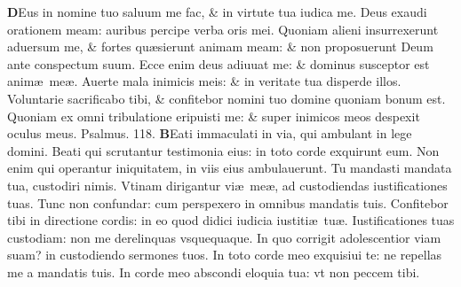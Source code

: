 \documentclass[a5paper,10pt]{book}
\def\ae{æ}
\begin{document}
\begin{multicols*}{2}
\lettrine[lines=2]{\bfseries D}{}Eus in nomine tuo saluum me fac, \& in virtute tua iudica me.
\newline \color{red} D\color{black}eus exaudi orationem meam: auribus percipe verba oris mei.
\newline \color{red} Q\color{black}uoniam alieni insurrexerunt aduersum me, \& fortes qu\ae sierunt animam meam: \& non proposuerunt Deum ante conspectum suum.
\newline \color{red} E\color{black}cce enim deus adiuuat me: \& dominus susceptor est anim\ae \ me\ae .
\newline \color{red} A\color{black}uerte mala inimicis meis: \& in veritate tua disperde illos.
\newline \color{red} V\color{black}oluntarie sacrificabo tibi, \& confitebor nomini tuo domine quoniam bonum est.
\newline \color{red} Q\color{black}uoniam ex omni tribulatione eripuisti me: \& super inimicos meos despexit oculus meus. \quad \color{red} Psalmus. 118. \color{black}
\vspace{-.5em}
\lettrine[lines=2]{\bfseries \color{red} B}{}Eati immaculati in via, qui ambulant in lege domini.
\newline \color{red} B\color{black}eati qui scrutantur testimonia eius: in toto corde exquirunt eum.
\newline \color{red} N\color{black}on enim qui operantur iniquitatem, in viis eius ambulauerunt.
\newline \color{red} T\color{black}u mandasti mandata tua, custodiri nimis.
\newline \color{red} V\color{black}tinam dirigantur vi\ae \ me\ae , ad custodiendas iustificationes tuas.
\newline \color{red} T\color{black}unc non confundar: cum perspexero in omnibus mandatis tuis.
\newline \color{red} C\color{black}onfitebor tibi in directione cordis: in eo quod didici iudicia iustiti\ae \ tu\ae .
\newline \color{red} I\color{black}ustificationes tuas custodiam: non me derelinquas vsquequaque.
\newline \color{red} I\color{black}n quo corrigit adolescentior viam suam? in custodiendo sermones tuos.
\newline \color{red} I\color{black}n toto corde meo exquisiui te: ne repellas me a mandatis tuis.
\newline \color{red} I\color{black}n corde meo abscondi eloquia tua: vt non peccem tibi.

\end{multicols*}
\end{document}
